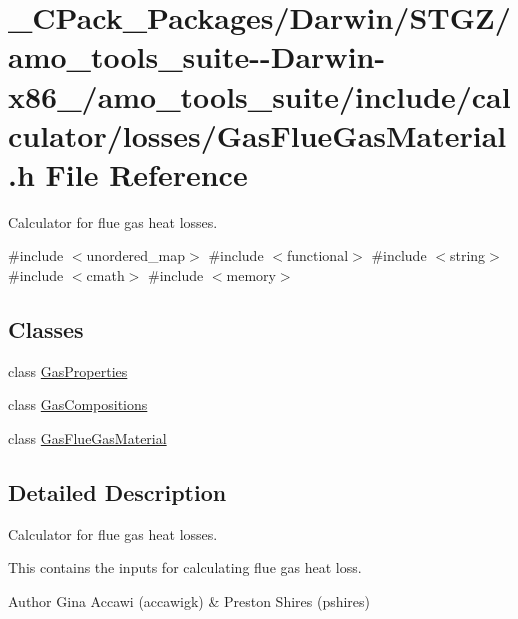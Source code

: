 \hypertarget{___c_pack___packages_2_darwin_2_s_t_g_z_2amo__tools__suite--_darwin-x86__64_2amo__tools__suite_2004d7ef7737e3755a6d819de5baaee93}{}\section{\+\_\+\+C\+Pack\+\_\+\+Packages/\+Darwin/\+S\+T\+G\+Z/amo\+\_\+tools\+\_\+suite-\/-\/\+Darwin-\/x86\+\_/amo\+\_\+tools\+\_\+suite/include/calculator/losses/\+Gas\+Flue\+Gas\+Material.h File Reference}
\label{___c_pack___packages_2_darwin_2_s_t_g_z_2amo__tools__suite--_darwin-x86__64_2amo__tools__suite_2004d7ef7737e3755a6d819de5baaee93}


Calculator for flue gas heat losses.  


{\ttfamily \#include $<$unordered\+\_\+map$>$}\newline
{\ttfamily \#include $<$functional$>$}\newline
{\ttfamily \#include $<$string$>$}\newline
{\ttfamily \#include $<$cmath$>$}\newline
{\ttfamily \#include $<$memory$>$}\newline
\subsection*{Classes}
\begin{DoxyCompactItemize}
\item 
class \hyperlink{class_gas_properties}{Gas\+Properties}
\item 
class \hyperlink{class_gas_compositions}{Gas\+Compositions}
\item 
class \hyperlink{class_gas_flue_gas_material}{Gas\+Flue\+Gas\+Material}
\end{DoxyCompactItemize}


\subsection{Detailed Description}
Calculator for flue gas heat losses. 

This contains the inputs for calculating flue gas heat loss.

\begin{DoxyAuthor}{Author}
Gina Accawi (accawigk) \& Preston Shires (pshires) 
\end{DoxyAuthor}
